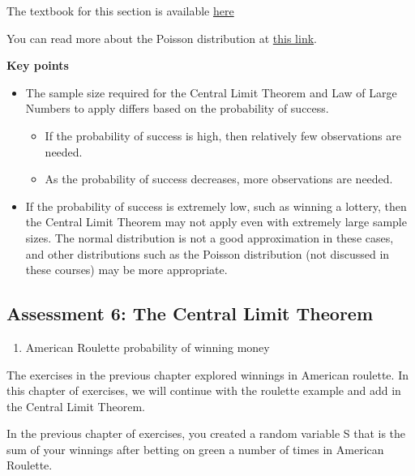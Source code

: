 \documentclass[
]{article}
\providecommand{\tightlist}{%
  \setlength{\itemsep}{0pt}\setlength{\parskip}{0pt}}
\begin{document}
The textbook for this section is available
\href{https://rafalab.github.io/dsbook/random-variables.html\#how-large-is-large-in-the-central-limit-theorem}{here}

You can read more about the Poisson distribution at
\href{https://en.wikipedia.org/wiki/Poisson_distribution}{this link}.

\textbf{Key points}

\begin{itemize}
\tightlist
\item
  The sample size required for the Central Limit Theorem and Law of
  Large Numbers to apply differs based on the probability of success.

  \begin{itemize}
  \tightlist
  \item
    If the probability of success is high, then relatively few
    observations are needed.
  \item
    As the probability of success decreases, more observations are
    needed.
  \end{itemize}
\item
  If the probability of success is extremely low, such as winning a
  lottery, then the Central Limit Theorem may not apply even with
  extremely large sample sizes. The normal distribution is not a good
  approximation in these cases, and other distributions such as the
  Poisson distribution (not discussed in these courses) may be more
  appropriate.
\end{itemize}

\hypertarget{assessment-6-the-central-limit-theorem}{%
\subsection{Assessment 6: The Central Limit
Theorem}\label{assessment-6-the-central-limit-theorem}}

\begin{enumerate}
\def\labelenumi{\arabic{enumi}.}
\tightlist
\item
  American Roulette probability of winning money
\end{enumerate}

The exercises in the previous chapter explored winnings in American
roulette. In this chapter of exercises, we will continue with the
roulette example and add in the Central Limit Theorem.

In the previous chapter of exercises, you created a random variable S
that is the sum of your winnings after betting on green a number of
times in American Roulette.
\end{document}
